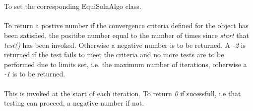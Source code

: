   \\
 \\
To set the corresponding EquiSolnAlgo class. \\

 \\
To return a postive number if the convergence criteria defined for the
object has been satisfied, the positibe number equal to the number of times 
since {\em start} that {\em test()} has been invoked. Otherwise a negative number 
is to be returned. A {\em -2} 
is returned if the test fails to meet the criteria and no more tests are to be 
performed due to limits set, i.e. the maximum number of iterations, otherwise a
{\em -1} is to be returned.  \\

 \\
This is invoked at the start of each iteration. To return {\em 0} if sucessfull, i.e 
that testing can proceed, a negative number if not. \\